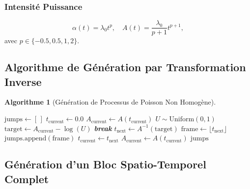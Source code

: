 \documentclass[12pt,a4paper]{article}
\newtheorem{algo}{Algorithme}[section]
\begin{document}
	\subsubsection{Intensité Puissance}
	\begin{equation}
		\alpha(t) = \lambda_0 t^p, \quad A(t) = \frac{\lambda_0}{p+1} t^{p+1},
	\end{equation}
	avec $p \in \{-0.5, 0.5, 1, 2\}$.
	
	\subsection{Algorithme de Génération par Transformation Inverse}
	\label{subsec:algorithme_generation}
	
	\begin{algo}[Génération de Processus de Poisson Non Homogène]
		\label{algo:generation_poisson}
		\begin{algorithmic}[1]
			\State $\text{jumps} \gets [\,]$
			\State $t_{\text{current}} \gets 0.0$
			\State $A_{\text{current}} \gets A(t_{\text{current}})$
			\State $U \sim \text{Uniform}(0, 1)$
			\State $\text{target} \gets A_{\text{current}} - \log(U)$
			\State \textbf{break}
			\EndIf
			\State $t_{\text{next}} \gets A^{-1}(\text{target})$
			\State $\text{frame} \gets \lfloor t_{\text{next}} \rfloor$
			\State $\text{jumps}.\text{append}(\text{frame})$
			\State $t_{\text{current}} \gets t_{\text{next}}$
			\State $A_{\text{current}} \gets A(t_{\text{current}})$
			\EndIf
			\EndWhile
			\State \Return $\text{jumps}$
			\EndProcedure
		\end{algorithmic}
	\end{algo}
	
	\subsection{Génération d'un Bloc Spatio-Temporel Complet}
	\label{subsec:generation_bloc}
	
\end{document}
